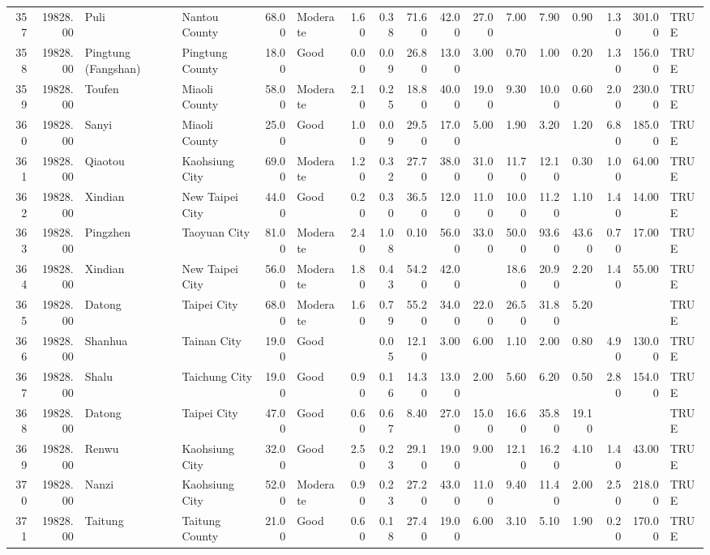 \begin{table}[ht]
\begin{tabular}{rrllrlrrrrrrrrrrl}
  357 & 19828.00 & Puli & Nantou County & 68.00 & Moderate & 1.60 & 0.38 & 71.60 & 42.00 & 27.00 & 7.00 & 7.90 & 0.90 & 1.30 & 301.00 & TRUE \\ 
  358 & 19828.00 & Pingtung (Fangshan) & Pingtung County & 18.00 & Good & 0.00 & 0.09 & 26.80 & 13.00 & 3.00 & 0.70 & 1.00 & 0.20 & 1.30 & 156.00 & TRUE \\ 
  359 & 19828.00 & Toufen & Miaoli County & 58.00 & Moderate & 2.10 & 0.25 & 18.80 & 40.00 & 19.00 & 9.30 & 10.00 & 0.60 & 2.00 & 230.00 & TRUE \\ 
  360 & 19828.00 & Sanyi & Miaoli County & 25.00 & Good & 1.00 & 0.09 & 29.50 & 17.00 & 5.00 & 1.90 & 3.20 & 1.20 & 6.80 & 185.00 & TRUE \\ 
  361 & 19828.00 & Qiaotou & Kaohsiung City & 69.00 & Moderate & 1.20 & 0.32 & 27.70 & 38.00 & 31.00 & 11.70 & 12.10 & 0.30 & 1.00 & 64.00 & TRUE \\ 
  362 & 19828.00 & Xindian & New Taipei City & 44.00 & Good & 0.20 & 0.30 & 36.50 & 12.00 & 11.00 & 10.00 & 11.20 & 1.10 & 1.40 & 14.00 & TRUE \\ 
  363 & 19828.00 & Pingzhen & Taoyuan City & 81.00 & Moderate & 2.40 & 1.08 & 0.10 & 56.00 & 33.00 & 50.00 & 93.60 & 43.60 & 0.70 & 17.00 & TRUE \\ 
  364 & 19828.00 & Xindian & New Taipei City & 56.00 & Moderate & 1.80 & 0.43 & 54.20 & 42.00 &  & 18.60 & 20.90 & 2.20 & 1.40 & 55.00 & TRUE \\ 
  365 & 19828.00 & Datong & Taipei City & 68.00 & Moderate & 1.60 & 0.79 & 55.20 & 34.00 & 22.00 & 26.50 & 31.80 & 5.20 &  &  & TRUE \\ 
  366 & 19828.00 & Shanhua & Tainan City & 19.00 & Good &  & 0.05 & 12.10 & 3.00 & 6.00 & 1.10 & 2.00 & 0.80 & 4.90 & 130.00 & TRUE \\ 
  367 & 19828.00 & Shalu & Taichung City & 19.00 & Good & 0.90 & 0.16 & 14.30 & 13.00 & 2.00 & 5.60 & 6.20 & 0.50 & 2.80 & 154.00 & TRUE \\ 
  368 & 19828.00 & Datong & Taipei City & 47.00 & Good & 0.60 & 0.67 & 8.40 & 27.00 & 15.00 & 16.60 & 35.80 & 19.10 &  &  & TRUE \\ 
  369 & 19828.00 & Renwu & Kaohsiung City & 32.00 & Good & 2.50 & 0.23 & 29.10 & 19.00 & 9.00 & 12.10 & 16.20 & 4.10 & 1.40 & 43.00 & TRUE \\ 
  370 & 19828.00 & Nanzi & Kaohsiung City & 52.00 & Moderate & 0.90 & 0.23 & 27.20 & 43.00 & 11.00 & 9.40 & 11.40 & 2.00 & 2.50 & 218.00 & TRUE \\ 
  371 & 19828.00 & Taitung & Taitung County & 21.00 & Good & 0.60 & 0.18 & 27.40 & 19.00 & 6.00 & 3.10 & 5.10 & 1.90 & 0.20 & 170.00 & TRUE \\ 

\end{tabular}
\end{table}

